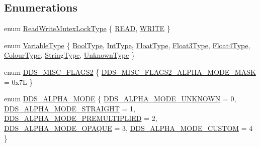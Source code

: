 \subsection*{Enumerations}
\begin{DoxyCompactItemize}
\item 
enum \hyperlink{namespacemage_afd76fcca37ce5c5b2227671290973c74}{Read\+Write\+Mutex\+Lock\+Type} \{ \hyperlink{namespacemage_afd76fcca37ce5c5b2227671290973c74a384918b13691984406aeb754f1c454d0}{R\+E\+AD}, 
\hyperlink{namespacemage_afd76fcca37ce5c5b2227671290973c74aff9d196f4bda4079f3f1ce90bd644662}{W\+R\+I\+TE}
 \}
\item 
enum \hyperlink{namespacemage_a530428e73bac0ba7fe84b29086a9e33a}{Variable\+Type} \{ \newline
\hyperlink{namespacemage_a530428e73bac0ba7fe84b29086a9e33aad329b4cfe2f7f84089d0bc9f75acdb42}{Bool\+Type}, 
\hyperlink{namespacemage_a530428e73bac0ba7fe84b29086a9e33aafa7cdf2ad6568f73ba81d484d58a533f}{Int\+Type}, 
\hyperlink{namespacemage_a530428e73bac0ba7fe84b29086a9e33aade7b5a52cfce1b14b6f8e553a7747939}{Float\+Type}, 
\hyperlink{namespacemage_a530428e73bac0ba7fe84b29086a9e33aa330f20a16d536c4976cf58e354fc6584}{Float3\+Type}, 
\newline
\hyperlink{namespacemage_a530428e73bac0ba7fe84b29086a9e33aa25e69e4405ceb3b38c05a9671e7f3b5d}{Float4\+Type}, 
\hyperlink{namespacemage_a530428e73bac0ba7fe84b29086a9e33aab5fbb412d1d7febfc4131514995233fc}{Colour\+Type}, 
\hyperlink{namespacemage_a530428e73bac0ba7fe84b29086a9e33aaacb26519a81b631235b51091b05c2b10}{String\+Type}, 
\hyperlink{namespacemage_a530428e73bac0ba7fe84b29086a9e33aa6e4917f41203f9eb5a3fbab1b4719712}{Unknown\+Type}
 \}
\item 
enum \hyperlink{namespacemage_a0943eceedce2e66b3b66d0566b15c712}{D\+D\+S\+\_\+\+M\+I\+S\+C\+\_\+\+F\+L\+A\+G\+S2} \{ \hyperlink{namespacemage_a0943eceedce2e66b3b66d0566b15c712af6954b93e1e18fa5366ebb55d65ecbcf}{D\+D\+S\+\_\+\+M\+I\+S\+C\+\_\+\+F\+L\+A\+G\+S2\+\_\+\+A\+L\+P\+H\+A\+\_\+\+M\+O\+D\+E\+\_\+\+M\+A\+SK} = 0x7L
 \}
\item 
enum \hyperlink{namespacemage_a0c586a2bad862f4858900ca121ca80c2}{D\+D\+S\+\_\+\+A\+L\+P\+H\+A\+\_\+\+M\+O\+DE} \{ \newline
\hyperlink{namespacemage_a0c586a2bad862f4858900ca121ca80c2ae15c70e072553fb579ef26eedb737768}{D\+D\+S\+\_\+\+A\+L\+P\+H\+A\+\_\+\+M\+O\+D\+E\+\_\+\+U\+N\+K\+N\+O\+WN} = 0, 
\hyperlink{namespacemage_a0c586a2bad862f4858900ca121ca80c2a2cfa12c9a40e943b5e51043c45db5f95}{D\+D\+S\+\_\+\+A\+L\+P\+H\+A\+\_\+\+M\+O\+D\+E\+\_\+\+S\+T\+R\+A\+I\+G\+HT} = 1, 
\hyperlink{namespacemage_a0c586a2bad862f4858900ca121ca80c2a6dfa3f7a9c0031bc87cc35d8365e3b74}{D\+D\+S\+\_\+\+A\+L\+P\+H\+A\+\_\+\+M\+O\+D\+E\+\_\+\+P\+R\+E\+M\+U\+L\+T\+I\+P\+L\+I\+ED} = 2, 
\hyperlink{namespacemage_a0c586a2bad862f4858900ca121ca80c2a0f5075a259bfecc6fb934b92bcc6dd1d}{D\+D\+S\+\_\+\+A\+L\+P\+H\+A\+\_\+\+M\+O\+D\+E\+\_\+\+O\+P\+A\+Q\+UE} = 3, 
\newline
\hyperlink{namespacemage_a0c586a2bad862f4858900ca121ca80c2a145fc5c46af6e8635680d59f55ce956f}{D\+D\+S\+\_\+\+A\+L\+P\+H\+A\+\_\+\+M\+O\+D\+E\+\_\+\+C\+U\+S\+T\+OM} = 4
 \}
\end{DoxyCompactItemize}
